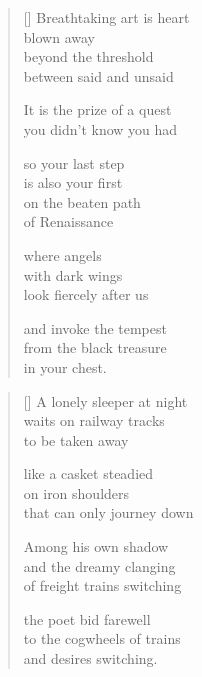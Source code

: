 \documentclass[14pt]{extbook}
\newcommand*{\centeredornament}{\centerline{\pgfornament[width=6cm]{88}}}
\begin{document}

\newpage

\vspace*{-15mm}
\centeredornament
\vspace*{-7mm}


\settowidth{\versewidth}{you didn't know you had}

\begin{verse}[\versewidth]
  Breathtaking art is heart \\
  blown away \\
  beyond the threshold \\
  between said and unsaid

  It is the prize of a quest \\
  you didn't know you had

  so your last step \\
  is also your first \\
  on the beaten path \\
  of Renaissance

  where angels \\
  with dark wings \\
  look fiercely after us

  and invoke the tempest \\
  from the black treasure \\
  in your chest.
\end{verse}


\newpage

\vspace*{-15mm}
\centeredornament
\vspace*{-7mm}


\settowidth{\versewidth}{that can only journey down}

\begin{verse}[\versewidth]
  A lonely sleeper at night \\
  waits on railway tracks \\
  to be taken away

  like a casket steadied \\
  on iron shoulders \\
  that can only journey down

  Among his own shadow \\
  and the dreamy clanging \\
  of freight trains switching

  the poet bid farewell \\
  to the cogwheels of trains \\
  and desires switching.
\end{verse}
\end{document}
